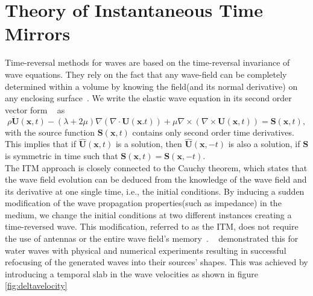 \section{Theory of Instantaneous Time Mirrors}\label{section:ITMTheory}
Time-reversal methods for waves are based on the time-reversal invariance of wave equations. They rely on the fact that any wave-field can be completely determined within
a volume by knowing the field(and its normal derivative) on any enclosing surface~\parencite{Bacot2016}. We write the elastic wave equation in its second order vector form
~\parencite[Cha. 2]{aki2002quantitative} as
\begin{equation}
    \rho \ddot{\mathbf{U}} \left( \mathbf{x}, t\right) - \left( \lambda + 2 \mu \right) \nabla \left(\nabla \cdot \mathbf{U}\left(\mathbf{x}. t\right)\right) 
    + \mu \nabla \times \left(\nabla \times \mathbf{U}\left(\mathbf{x},t\right)\right) = \mathbf{S}\left(\mathbf{x},t\right),
\end{equation}
with the source function $\mathbf{S}\left(\mathbf{x},t\right)$ contains only second order time derivatives. This implies that if $\hat{\mathbf{U}}\left(\mathbf{x},t\right)$
is a solution, then $\hat{\mathbf{U}}\left(\mathbf{x}, -t\right)$ is also a solution, if $\mathbf{S}$ is symmetric in time such that 
$\mathbf{S}\left(\mathbf{x}, t\right) = \mathbf{S}\left(\mathbf{x}, -t\right)$. \\

The \ac{ITM} approach is closely connected to the Cauchy theorem, which states that the wave field evolution can be deduced from the knowledge of the wave field
and its derivative at one single time, i.e., the initial conditions. By inducing a sudden modification of the wave propagation properties(such as impedance) in the
medium, we change the initial conditions at two different instances creating a time-reversed wave. This modification, referred to as the \ac{ITM}, does not require the use of antennas or the entire wave field's memory~\parencite{Bacot2016}.
~\parencite{Bacot2016} demonstrated this for water waves with physical and numerical experiments resulting in successful refocusing of the generated waves into their
sources' shapes. This was achieved by introducing a temporal slab in the wave velocities as shown in figure \ref{fig:deltavelocity}


